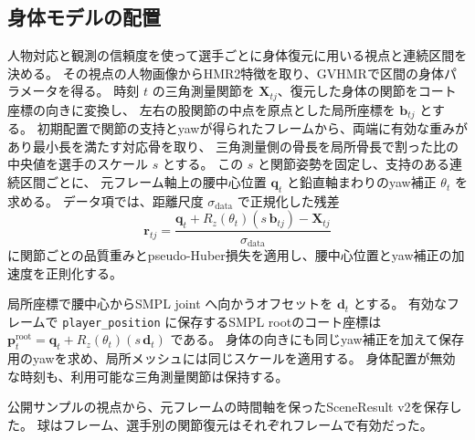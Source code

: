 \subsection{身体モデルの配置}

人物対応と観測の信頼度を使って選手ごとに身体復元に用いる視点と連続区間を決める。
その視点の人物画像からHMR2特徴\cite{hmr2}を取り、GVHMRで区間の身体パラメータを得る。
時刻 $t$ の三角測量関節を $\mathbf X_{tj}$、復元した身体の関節をコート座標の向きに変換し、
左右の股関節の中点を原点とした局所座標を $\mathbf b_{tj}$ とする。
初期配置で関節の支持とyawが得られたフレームから、両端に有効な重みがあり最小長を満たす対応骨を取り、
三角測量側の骨長を局所骨長で割った比の中央値を選手のスケール $s$ とする。
この $s$ と関節姿勢を固定し、支持のある連続区間ごとに、
元フレーム軸上の腰中心位置 $\mathbf q_t$ と鉛直軸まわりのyaw補正 $\theta_t$ を求める。
データ項では、距離尺度 $\sigma_{\mathrm{data}}$ で正規化した残差
\[
  \mathbf r_{tj}
  = \frac{\mathbf q_t + R_z(\theta_t)(s\,\mathbf b_{tj}) - \mathbf X_{tj}}
         {\sigma_{\mathrm{data}}}
\]
に関節ごとの品質重みとpseudo-Huber損失を適用し、腰中心位置とyaw補正の加速度を正則化する。

局所座標で腰中心からSMPL joint へ向かうオフセットを $\mathbf d_t$ とする。
有効なフレームで \texttt{player\_position} に保存するSMPL rootのコート座標は
$\mathbf p_t^{\mathrm{root}}=\mathbf q_t+R_z(\theta_t)(s\,\mathbf d_t)$ である。
身体の向きにも同じyaw補正を加えて保存用のyawを求め、局所メッシュには同じスケールを適用する。
身体配置が無効な時刻も、利用可能な三角測量関節は保持する。

公開サンプルの視点から、元フレームの時間軸を保ったSceneResult v2を保存した。
球はフレーム、選手別の関節復元はそれぞれフレームで有効だった。
\FloatBarrier
